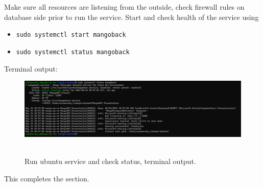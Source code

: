 Make sure all resources are listening from the outside, check firewall rules on database side prior to run the service.
Start and check health of the service using
\begin{itemize}
    \item \texttt{sudo systemctl start mangoback}
    \item \texttt{sudo systemctl status mangoback}
\end{itemize}
Terminal output:
\begin{figure}[H]
    \centering
    \includegraphics[width=1\textwidth]{img/05_ubuntu_service_status}
    ~\caption{Run ubuntu service and check status, terminal output.}\label{fig:figure14}
\end{figure}
This completes the section.
